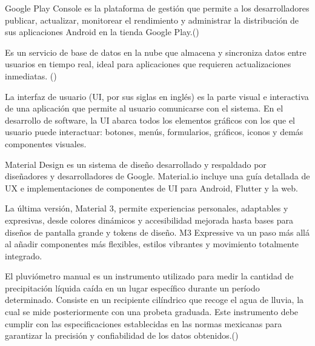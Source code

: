 \begin{definition}
  Google Play Console es la plataforma de gestión que permite a los desarrolladores publicar, actualizar, monitorear el rendimiento y administrar la distribución de sus aplicaciones Android en la tienda Google Play.(\cite{googleplayconsole})


\end{definition}

\begin{definition}
Es un servicio de base de datos en la nube que almacena y sincroniza datos entre usuarios en tiempo real, ideal para aplicaciones que requieren actualizaciones inmediatas. (\cite{firebaserealtime})
\end{definition}

\begin{definition}
  La interfaz de usuario (UI, por sus siglas en inglés) es la parte visual e interactiva de una aplicación que permite al usuario comunicarse con el sistema. En el desarrollo de software, la UI abarca todos los elementos gráficos con los que el usuario puede interactuar: botones, menús, formularios, gráficos, iconos y demás componentes visuales.   
\end{definition}


\begin{definition}
Material Design es un sistema de diseño desarrollado y respaldado por diseñadores y desarrolladores de Google. Material.io incluye una guía detallada de UX e implementaciones de componentes de UI para Android, Flutter y la web.

La última versión, Material 3, permite experiencias personales, adaptables y expresivas, desde colores dinámicos y accesibilidad mejorada hasta bases para diseños de pantalla grande y tokens de diseño. M3 Expressive va un paso más allá al añadir componentes más flexibles, estilos vibrantes y movimiento totalmente integrado. \cite{materialdesign2023}
\end{definition}

\begin{definition}

El pluviómetro manual es un instrumento utilizado para medir la cantidad de precipitación líquida caída en un lugar específico durante un período determinado. Consiste en un recipiente cilíndrico que recoge el agua de lluvia, la cual se mide posteriormente con una probeta graduada. Este instrumento debe cumplir con las especificaciones establecidas en las normas mexicanas para garantizar la precisión y confiabilidad de los datos obtenidos.(\cite{semarnat_pluviometro})
\end{definition}

